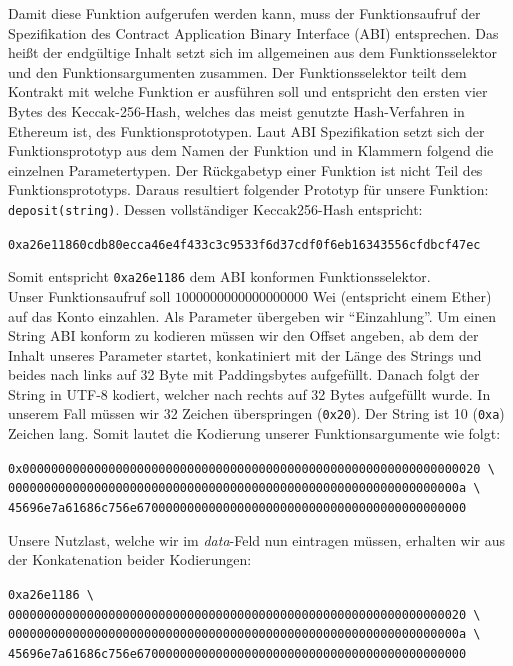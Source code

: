 \documentclass[runningheads]{llncs}
\begin{document}
Damit diese Funktion aufgerufen werden kann, muss der Funktionsaufruf der Spezifikation des Contract Application Binary Interface (ABI) entsprechen. %
Das heißt der endgültige Inhalt setzt sich im allgemeinen aus dem Funktionsselektor und den Funktionsargumenten zusammen. Der Funktionsselektor teilt dem Kontrakt mit welche Funktion er ausführen soll und entspricht den ersten vier Bytes des Keccak-256-Hash, welches das meist genutzte Hash-Verfahren in Ethereum ist, des Funktionsprototypen. Laut ABI Spezifikation setzt sich der Funktionsprototyp aus dem Namen der Funktion und in Klammern folgend die einzelnen Parametertypen. Der Rückgabetyp einer Funktion ist nicht Teil des Funktionsprototyps.
Daraus resultiert folgender Prototyp für unsere Funktion: \verb+deposit(string)+.
Dessen vollständiger Keccak256-Hash entspricht:
\begingroup
\fontsize{8pt}{10pt}\selectfont
\begin{center}
  \verb+0xa26e11860cdb80ecca46e4f433c3c9533f6d37cdf0f6eb16343556cfdbcf47ec+
\end{center}
\endgroup
Somit entspricht \verb+0xa26e1186+ dem ABI konformen Funktionsselektor.\\
Unser Funktionsaufruf soll $1000000000000000000$ Wei (entspricht einem Ether) auf das Konto einzahlen. Als Parameter übergeben wir "`Einzahlung"'. Um einen String ABI konform zu kodieren müssen wir den Offset angeben, ab dem der Inhalt unseres Parameter startet, konkatiniert mit der Länge des Strings und beides nach links auf 32 Byte mit Paddingsbytes aufgefüllt. Danach folgt der String in UTF-8 kodiert, welcher nach rechts auf 32 Bytes aufgefüllt wurde. In unserem Fall müssen wir 32 Zeichen überspringen (\texttt{0x20}). Der String ist 10 (\texttt{0xa}) Zeichen lang. Somit lautet die Kodierung unserer Funktionsargumente wie folgt:
\begingroup
\fontsize{8pt}{10pt}\selectfont
\begin{center}
  \texttt{0x0000000000000000000000000000000000000000000000000000000000000020 \textbackslash} \\
  \texttt{000000000000000000000000000000000000000000000000000000000000000a \textbackslash} \\
  \texttt{45696e7a61686c756e6700000000000000000000000000000000000000000000}
\end{center}
\endgroup
Unsere Nutzlast, welche wir im \textit{data}-Feld nun eintragen müssen, erhalten wir aus der Konkatenation beider Kodierungen:
\begingroup
\fontsize{8pt}{10pt}\selectfont
\begin{center}
  \texttt{0xa26e1186 \textbackslash} \\
  \texttt{0000000000000000000000000000000000000000000000000000000000000020 \textbackslash} \\
  \texttt{000000000000000000000000000000000000000000000000000000000000000a \textbackslash} \\
  \texttt{45696e7a61686c756e6700000000000000000000000000000000000000000000}
\end{center}
\endgroup
\end{document}
